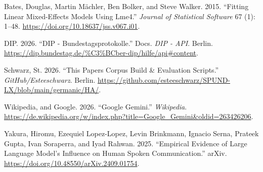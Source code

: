 \documentclass[
  letterpaper,
  DIV=11,
  numbers=noendperiod]{scrartcl}
\newlength{\cslhangindent}
\newenvironment{CSLReferences}[2] %
 {\begin{list}{}{%
  \setlength{\itemindent}{0pt}
  \setlength{\leftmargin}{0pt}
  \setlength{\parsep}{0pt}
  \ifodd #1
   \setlength{\leftmargin}{\cslhangindent}
   \setlength{\itemindent}{-1\cslhangindent}
  \fi
  \setlength{\itemsep}{#2\baselineskip}}}
 {\end{list}}
\begin{document}
\label{refs}
\begin{CSLReferences}{1}{0}
Bates, Douglas, Martin Mächler, Ben Bolker, and Steve Walker. 2015.
{``Fitting {Linear} {Mixed}-{Effects} {Models} {Using} Lme4.''}
\emph{Journal of Statistical Software} 67 (1): 1--48.
\url{https://doi.org/10.18637/jss.v067.i01}.

DIP. 2026. {``{DIP} - {Bundestagsprotokolle}.''} Docs. \emph{DIP - API}.
Berlin.
\url{https://dip.bundestag.de/\%C3\%BCber-dip/hilfe/api\#content}.

Schwarz, St. 2026. {``This Papers Corpus Build \& Evaluation Scripts.''}
\emph{GitHub/Esteeschwarz}. Berlin.
\url{https://github.com/esteeschwarz/SPUND-LX/blob/main/germanic/HA/}.

Wikipedia, and Google. 2026. {``Google {Gemini}.''} \emph{Wikipedia}.
\url{https://de.wikipedia.org/w/index.php?title=Google_Gemini&oldid=263426206}.

Yakura, Hiromu, Ezequiel Lopez-Lopez, Levin Brinkmann, Ignacio Serna,
Prateek Gupta, Ivan Soraperra, and Iyad Rahwan. 2025. {``Empirical
Evidence of {Large} {Language} {Model}'s Influence on Human Spoken
Communication.''} arXiv.
\url{https://doi.org/10.48550/arXiv.2409.01754}.

\end{CSLReferences}
\end{document}
